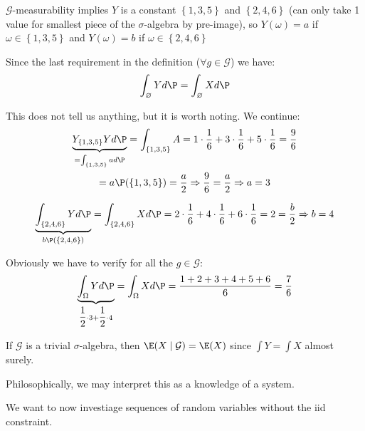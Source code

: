 \noindent $\mathcal{G}$-measurability implies $Y$ is a constant $\left\{1,3,5\right\}$ and $\left\{2,4,6\right\}$ (can only take 1 value for smallest piece of the $\sigma$-algebra by pre-image), so $Y(\omega) = a$ if $\omega\in\left\{1,3,5\right\}$ and $Y(\omega) = b$ if $\omega \in \left\{2,4,6\right\}$\par
\noindent Since the last requirement in the definition ($\forall g\in\mathcal{G}$) we have:
\begin{equation*}
  \begin{gathered}
    \int_\varnothing Yd\P = \int_\varnothing Xd\P
  \end{gathered}
\end{equation*}\par
\noindent This does not tell us anything, but it is worth noting. We continue:
\begin{equation*}
  \begin{gathered}
    \underbrace{Y_{\left\{1,3,5\right\}} Yd\P}_{= \int_{\left\{1,3,5\right\}}ad\P}= \int_{\left\{1,3,5\right\}}A = 1\cdot\dfrac{1}{6}+3\cdot\dfrac{1}{6}+5\cdot\dfrac{1}{6} = \dfrac{9}{6}\\
     = a\P(\left\{1,3,5\right\}) = \dfrac{a}{2}\Rightarrow \dfrac{9}{6} = \dfrac{a}{2} \Rightarrow a = 3
  \end{gathered}
\end{equation*}
\par\bigskip
\begin{equation*}
  \begin{gathered}
    \underbrace{\int_{\left\{2,4,6\right\}} Yd\P}_{b\P(\left\{2,4,6\right\})}= \int_{\left\{2,4,6\right\}}Xd\P = 2\cdot\dfrac{1}{6}+4\cdot\dfrac{1}{6}+6\cdot\dfrac{1}{6} = 2 = \dfrac{b}{2}\Rightarrow b = 4
  \end{gathered}
\end{equation*}\par
\noindent Obviously we have to verify for all the $g\in\mathcal{G}$:
\begin{equation*}
  \begin{gathered}
    \underbrace{\int_\Omega Yd\P}_{\dfrac{1}{2}\cdot3+\dfrac{1}{2}\cdot4}= \int_\Omega Xd\P = \dfrac{1+2+3+4+5+6}{6} = \dfrac{7}{6}
  \end{gathered}
\end{equation*}
\par\bigskip
\noindent If $\mathcal{G}$ is a trivial $\sigma$-algebra, then $\E(X\mid\mathcal{G}) = \E(X)$ since $\int Y = \int X$ almost surely.
\par\bigskip
\noindent Philosophically, we may interpret this as a knowledge of a system.\par
\noindent We want to now investiage sequences of random variables without the iid constraint.
\par\bigskip
